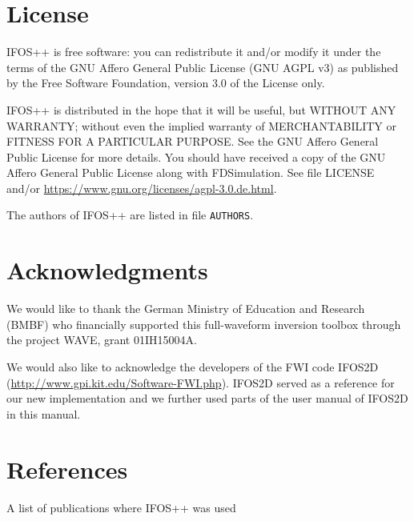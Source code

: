 \documentclass[pdftex,a4paper,parskip,listof=totoc,bibliography=totoc,onehalfspacing,12pt]{scrreprt}
\begin{document}
\tableofcontents %



\setcounter{page}{1}

\cleardoublepage
\chapter*{License}

IFOS++ is free software: you can redistribute it and/or modify it under the terms of the GNU Affero General Public License (GNU AGPL v3) as published by the Free Software Foundation, version 3.0 of the License only.
 
IFOS++ is distributed in the hope that it will be useful, but WITHOUT ANY WARRANTY; without even the implied warranty of MERCHANTABILITY or FITNESS FOR A PARTICULAR PURPOSE. See the GNU Affero General Public License for more details. You should have received a copy of the GNU Affero General Public License along with FDSimulation. See file LICENSE and/or \url{https://www.gnu.org/licenses/agpl-3.0.de.html}.

The authors of IFOS++ are listed in file \lstinline{AUTHORS}.

\chapter*{Acknowledgments}

We would like to thank the German Ministry of Education and Research (BMBF) who financially supported this full-waveform inversion toolbox through the project WAVE, grant 01IH15004A.

We would also like to acknowledge the developers of the FWI code IFOS2D (\url{http://www.gpi.kit.edu/Software-FWI.php}). IFOS2D served as a reference for our new implementation and we further used parts of the user manual of IFOS2D in this manual.

\chapter*{References}

A list of publications where IFOS++ was used


\cleardoublepage
\end{document}
